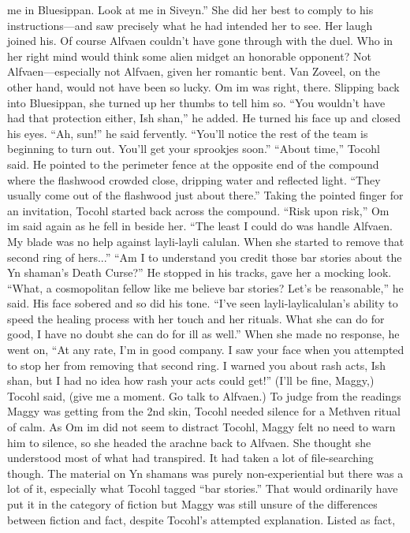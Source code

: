 \documentclass[9pt]{article}
\begin{document}
me in Bluesippan. Look at me in Siveyn.”
She did her best to comply to his instructions—and saw precisely what he had intended her to see.
Her laugh joined his.
Of course Alfvaen couldn’t have gone through with the duel. Who in her right mind would think some
alien midget an honorable opponent? Not Alfvaen—especially not Alfvaen, given her romantic bent. Van
Zoveel, on the other hand, would not have been so lucky. Om im was right, there. Slipping back into
Bluesippan, she turned up her thumbs to tell him so.
“You wouldn’t have had that protection either, Ish shan,” he added. He turned his face up and closed
his eyes. “Ah, sun!” he said fervently. “You’ll notice the rest of the team is beginning to turn out. You’ll
get your sprookjes soon.”
“About time,” Tocohl said.
He pointed to the perimeter fence at the opposite end of the compound where the flashwood
crowded close, dripping water and reflected light. “They usually come out of the flashwood just about
there.”
Taking the pointed finger for an invitation, Tocohl started back across the compound.
“Risk upon risk,” Om im said again as he fell in beside her. “The least I could do was handle Alfvaen.
My blade was no help against layli-layli calulan. When she started to remove that second ring of
hers...”
“Am I to understand you credit those bar stories about the Yn shaman’s Death Curse?”
He stopped in his tracks, gave her a mocking look. “What, a cosmopolitan fellow like me believe bar
stories? Let’s be reasonable,” he said. His face sobered and so did his tone. “I’ve seen layli-laylicalulan’s ability to speed the healing process with her touch and her rituals. What she can do for good, I
have no doubt she can do for ill as well.”
When she made no response, he went on, “At any rate, I’m in good company. I saw your face when
you attempted to stop her from removing that second ring. I warned you about rash acts, Ish shan, but I
had no idea how rash your acts could get!”
(I’ll be fine, Maggy,) Tocohl said, (give me a moment. Go talk to Alfvaen.)
To judge from the readings Maggy was getting from the 2nd skin, Tocohl needed silence for a
Methven ritual of calm. As Om im did not seem to distract Tocohl, Maggy felt no need to warn him to
silence, so she headed the arachne back to Alfvaen.
She thought she understood most of what had transpired. It had taken a lot of file-searching though.
The material on Yn shamans was purely non-experiential but there was a lot of it, especially what Tocohl
tagged “bar stories.” That would ordinarily have put it in the category of fiction but Maggy was still
unsure of the differences between fiction and fact, despite Tocohl’s attempted explanation. Listed as fact,
\end{document}
